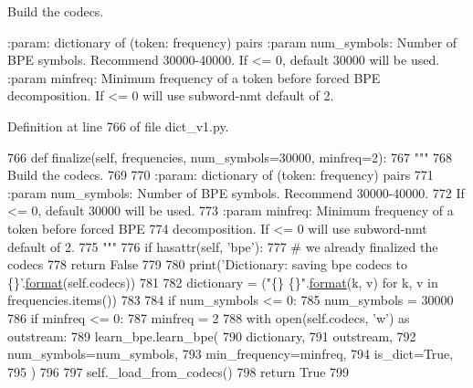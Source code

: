 \begin{DoxyVerb}Build the codecs.

:param: dictionary of (token: frequency) pairs
:param num_symbols: Number of BPE symbols. Recommend 30000-40000.
    If <= 0, default 30000 will be used.
:param minfreq: Minimum frequency of a token before forced BPE
    decomposition. If <= 0 will use subword-nmt default of 2.
\end{DoxyVerb}
 

Definition at line 766 of file dict\+\_\+v1.\+py.


\begin{DoxyCode}
766     \textcolor{keyword}{def }finalize(self, frequencies, num\_symbols=30000, minfreq=2):
767         \textcolor{stringliteral}{"""}
768 \textcolor{stringliteral}{        Build the codecs.}
769 \textcolor{stringliteral}{}
770 \textcolor{stringliteral}{        :param: dictionary of (token: frequency) pairs}
771 \textcolor{stringliteral}{        :param num\_symbols: Number of BPE symbols. Recommend 30000-40000.}
772 \textcolor{stringliteral}{            If <= 0, default 30000 will be used.}
773 \textcolor{stringliteral}{        :param minfreq: Minimum frequency of a token before forced BPE}
774 \textcolor{stringliteral}{            decomposition. If <= 0 will use subword-nmt default of 2.}
775 \textcolor{stringliteral}{        """}
776         \textcolor{keywordflow}{if} hasattr(self, \textcolor{stringliteral}{'bpe'}):
777             \textcolor{comment}{# we already finalized the codecs}
778             \textcolor{keywordflow}{return} \textcolor{keyword}{False}
779 
780         print(\textcolor{stringliteral}{'Dictionary: saving bpe codecs to \{\}'}.\hyperlink{namespaceparlai_1_1chat__service_1_1services_1_1messenger_1_1shared__utils_a32e2e2022b824fbaf80c747160b52a76}{format}(self.codecs))
781 
782         dictionary = (\textcolor{stringliteral}{"\{\} \{\}"}.\hyperlink{namespaceparlai_1_1chat__service_1_1services_1_1messenger_1_1shared__utils_a32e2e2022b824fbaf80c747160b52a76}{format}(k, v) \textcolor{keywordflow}{for} k, v \textcolor{keywordflow}{in} frequencies.items())
783 
784         \textcolor{keywordflow}{if} num\_symbols <= 0:
785             num\_symbols = 30000
786         \textcolor{keywordflow}{if} minfreq <= 0:
787             minfreq = 2
788         with open(self.codecs, \textcolor{stringliteral}{'w'}) \textcolor{keyword}{as} outstream:
789             learn\_bpe.learn\_bpe(
790                 dictionary,
791                 outstream,
792                 num\_symbols=num\_symbols,
793                 min\_frequency=minfreq,
794                 is\_dict=\textcolor{keyword}{True},
795             )
796 
797         self.\_load\_from\_codecs()
798         \textcolor{keywordflow}{return} \textcolor{keyword}{True}
799 \end{DoxyCode}

